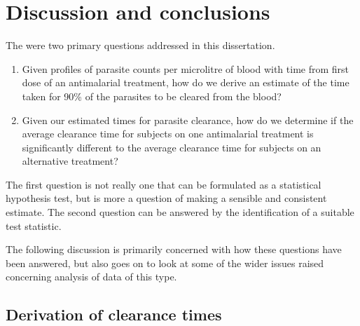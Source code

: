 \chapter{Discussion and conclusions}\label{ch:discussion}
The were two primary questions addressed in this dissertation.
\begin{enumerate}
\item Given profiles of parasite counts per microlitre of blood with time from first dose of an antimalarial treatment, how do we derive an estimate of the time taken for 90\% of the parasites to be cleared from the blood?
\item Given our estimated times for parasite clearance, how do we determine if the average clearance time for subjects on one antimalarial treatment is significantly different to the average clearance time for subjects on an alternative treatment?
\end{enumerate}
The first question is not really one that can be formulated as a statistical hypothesis test, but is more a question of making a sensible and consistent estimate. The second question can be answered by the identification of a suitable test statistic.

The following discussion is primarily concerned with how these questions have been answered, but also goes on to look at some of the wider issues raised concerning analysis of data of this type.

\section{Derivation of clearance times}

